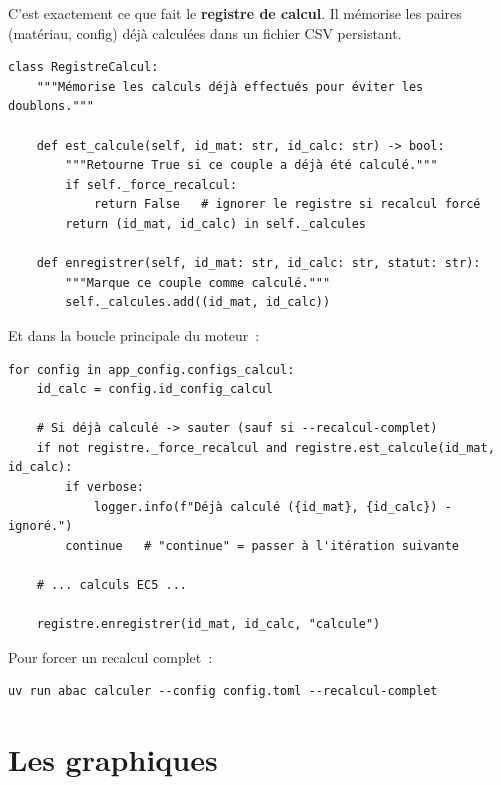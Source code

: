 \documentclass[12pt, a4paper, openany]{book}
\newcommand{\fichier}[1]{\texttt{\textit{#1}}}
\begin{document}
\begin{maitre}
C'est exactement ce que fait le \textbf{registre de calcul}.
Il m\'emorise les paires (mat\'eriau, config) d\'ej\`a calcul\'ees
dans un fichier CSV persistant.
\end{maitre}

\begin{lstlisting}[style=python, caption={Registre incrémental --- extrait de \fichier{registre.py}}]
class RegistreCalcul:
    """Mémorise les calculs déjà effectués pour éviter les doublons."""

    def est_calcule(self, id_mat: str, id_calc: str) -> bool:
        """Retourne True si ce couple a déjà été calculé."""
        if self._force_recalcul:
            return False   # ignorer le registre si recalcul forcé
        return (id_mat, id_calc) in self._calcules

    def enregistrer(self, id_mat: str, id_calc: str, statut: str):
        """Marque ce couple comme calculé."""
        self._calcules.add((id_mat, id_calc))
\end{lstlisting}

Et dans la boucle principale du moteur~:

\begin{lstlisting}[style=python, caption={Usage du registre dans \fichier{moteur.py}}]
for config in app_config.configs_calcul:
    id_calc = config.id_config_calcul

    # Si déjà calculé -> sauter (sauf si --recalcul-complet)
    if not registre._force_recalcul and registre.est_calcule(id_mat, id_calc):
        if verbose:
            logger.info(f"Déjà calculé ({id_mat}, {id_calc}) - ignoré.")
        continue   # "continue" = passer à l'itération suivante

    # ... calculs EC5 ...

    registre.enregistrer(id_mat, id_calc, "calcule")
\end{lstlisting}

Pour forcer un recalcul complet~:

\begin{lstlisting}[style=toml, language={}, caption={Forcer le recalcul complet}]
uv run abac calculer --config config.toml --recalcul-complet
\end{lstlisting}

\section{Les graphiques}
\end{document}
